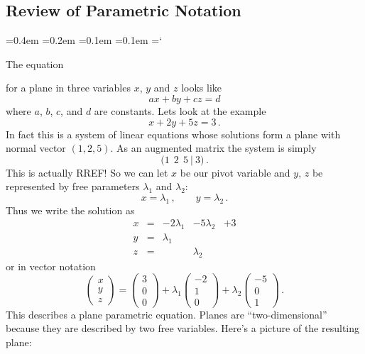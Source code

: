 
\subsection*{Review of Parametric Notation}

{\ttfamily
{}\font=0.4em
\font=0.2em
\font=0.1em
\font=0.1em
\hyphenchar\font=`\-

\hypertarget{scripts_vectors_in_space_n_vectors_parametric}{The equation}  for a plane in three variables $x$, $y$ and $z$ looks like
$$
ax+by+cz=d
$$
where $a$, $b$, $c$, and $d$ are constants.
Lets look at the example
$$
x+2y+5z=3\, .
$$
In fact this is a system of linear equations whose solutions form  a plane with normal vector $(1,2,5)$.
As an augmented matrix the system is simply
$$
\Big( 1 \ \ 2 \ \ 5\ \Big| \ 3 \Big)\, .
$$
This is actually RREF! So we can let $x$ be our pivot variable and $y$, $z$ be represented
by free parameters $\lambda_1$ and $\lambda_2$:
$$
x=\lambda_1\, , \qquad y = \lambda_2\, .
$$
Thus we write the solution as
$$
\begin{array}{ccccc}
x&=&-2\lambda_1&-5\lambda_2&+3\\
y&=&\lambda_1&&\\
z&=&&\lambda_2&
\end{array}
$$
or in vector notation
$$
\begin{pmatrix}
x\\y\\z
\end{pmatrix}
=
\begin{pmatrix}
3\\0\\0
\end{pmatrix}
+\lambda_1
\begin{pmatrix}
-2\\1\\0
\end{pmatrix}
+\lambda_2
\begin{pmatrix}
-5\\0\\1
\end{pmatrix}\, .
$$
This describes a plane parametric equation. Planes are ``two-dimensional'' because they are 
described by two free variables. Here's a picture of the resulting plane:
\begin{center}

\end{center}}
